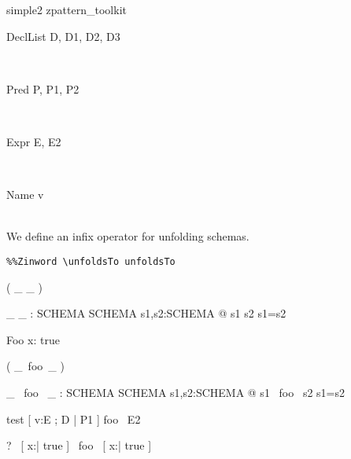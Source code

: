 \begin{zsection}
\SECTION simple2 \parents zpattern\_toolkit
\end{zsection}

\begin{zedjoker}{DeclList} D, D1, D2, D3\end{zedjoker} \\
\begin{zedjoker}{Pred} P, P1, P2\end{zedjoker} \\
\begin{zedjoker}{Expr} E, E2\end{zedjoker} \\
\begin{zedjoker}{Name} v\end{zedjoker} \\

We define an infix operator for unfolding schemas.


\newcommand{\unfoldsTo}{\mathrel{\leadsto}}

\begin{verbatim}
%%Zinword \unfoldsTo unfoldsTo
\end{verbatim}

\begin{zed}
  \relation ( \_ \unfoldsTo \_ )
\end{zed}

\begin{gendef}[SCHEMA]
  \_ \unfoldsTo \_ : SCHEMA \rel SCHEMA
\where
  \forall s1,s2:SCHEMA @ s1 \unfoldsTo s2 \iff s1=s2
\end{gendef}


\begin{schema}{Foo}
  x:\nat
\where
  true
\end{schema}

\begin{zed}
  \relation ( \_~foo~\_ )
\end{zed}

\begin{gendef}[SCHEMA]
  \_ ~foo~ \_ : SCHEMA \rel SCHEMA
\where
  \forall s1,s2:SCHEMA @ s1 ~foo~ s2 \iff s1=s2
\end{gendef}

\begin{zedrule}{test}
  [ v:E ; D | P1 ] foo~ E2
\end{zedrule}

\begin{zed}
  \vdash?~ [ x:\nat | true ] ~foo~ [ x:\nat | true ]
\end{zed}

